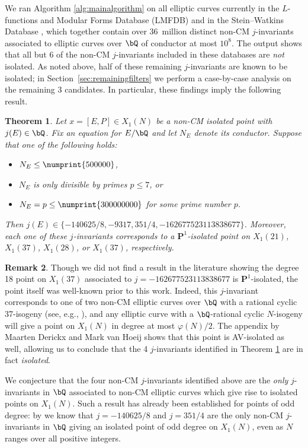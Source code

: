 \documentclass[11pt,reqno]{amsart}
\theoremstyle{plain}
\newtheorem{theorem}{Theorem}%
\theoremstyle{definition}
\newtheorem{remark}[theorem]{Remark}
\newcommand{\Q}{\bQ}
\newcommand{\PP}{\mathbf P}
\newcommand{\abedit}[1]{{\color{blue} #1}}
\begin{document}
We ran Algorithm \ref{alg:mainalgorithm} on all elliptic curves currently in the $L$-functions and Modular Forms Database (LMFDB) \cite{LMFDB} and in the Stein--Watkins Database \cite{SteinWatkins}, which together contain over 36~million distinct non-CM $j$-invariants associated to elliptic curves over $\Q$ of conductor at most $10^8$. The output shows that all but 6 of the non-CM $j$-invariants included in these databases are \emph{not} isolated. As noted above, half of these remaining $j$-invariants are known to be isolated; in Section~\ref{sec:remainingfilters} we perform a case-by-case analysis on the remaining $3$ candidates. In particular, these findings imply the following result.

\begin{theorem}\label{LMFDBoutputThm}
Let $x=[E,P]\in X_1(N)$ be a non-CM isolated point with $j(E) \in \Q$.
Fix an equation for $E/\Q$ and let $N_E$ denote its conductor.
Suppose that one of the following holds:
\begin{itemize}
    \item $N_E \leq \numprint{500000}$,
    \item $N_E$ is only divisible by primes $p \leq 7$, or
    \item $N_E=p \leq \numprint{300000000}$ for some prime number $p$.
\end{itemize}
Then $j(E) \in \{-140625/8,-9317,351/4, -162677523113838677\}$. Moreover, each one of these $j$-invariants corresponds to a $\PP^1$-isolated point on $X_1(21)$, $X_1(37)$, $X_1(28)$, or $X_1(37)$, respectively.
\end{theorem}

\begin{remark}
Though we did not find a result in the literature showing the degree 18 point on $X_1(37)$ associated to $j=-162677523113838677$ is $\PP^1$-isolated, the point itself was well-known prior to this work. Indeed, this $j$-invariant corresponds to one of two non-CM elliptic curves over $\Q$ with a rational cyclic 37-isogeny (see, e.g., \cite[Table 4]{LRAnn}), and any elliptic curve with a $\Q$-rational cyclic $N$-isogeny will give a point on $X_1(N)$ in degree at most $\varphi(N)/2$. \abedit{The appendix by} Maarten Derickx and Mark van Hoeij \abedit{shows} that this point is AV-isolated as well, allowing us to conclude that the 4 $j$-invariants identified in Theorem \ref{LMFDBoutputThm} are in fact \emph{isolated}.
\end{remark}

We conjecture that the four non-CM $j$-invariants identified above are the \emph{only} $j$-invariants in $\Q$ associated to non-CM elliptic curves which give rise to isolated points on $X_1(N)$. Such a result has already been established for points of odd degree: by \cite{OddDeg} we know that $j=-140625/8$ and $j=351/4$ are the only non-CM $j$-invariants in $\Q$ giving an isolated point of odd degree on $X_1(N)$, even as $N$ ranges over all positive integers.
\end{document}
